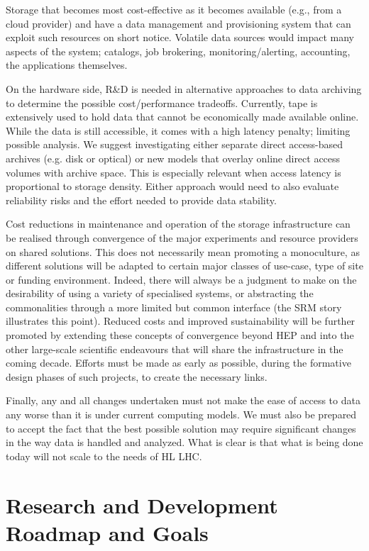 \documentclass[12pt,a4paper]{article}
\begin{document}
Storage that becomes most cost-effective as it becomes available (e.g.,
from a cloud provider) and have a data management and provisioning
system that can exploit such resources on short notice. Volatile data
sources would impact many aspects of the system; catalogs, job
brokering, monitoring/alerting, accounting, the applications themselves.

On the hardware side, R\&D is needed in alternative approaches to data
archiving to determine the possible cost/performance tradeoffs.
Currently, tape is extensively used to hold data that cannot be
economically made available online. While the data is still accessible,
it comes with a high latency penalty; limiting possible analysis. We
suggest investigating either separate direct access-based archives (e.g.
disk or optical) or new models that overlay online direct access volumes
with archive space. This is especially relevant when access latency is
proportional to storage density. Either approach would need to also
evaluate reliability risks and the effort needed to provide data
stability.

Cost reductions in maintenance and operation of the storage
infrastructure can be realised through convergence of the major
experiments and resource providers on shared solutions. This does not
necessarily mean promoting a monoculture, as different solutions will be
adapted to certain major classes of use-case, type of site or funding
environment. Indeed, there will always be a judgment to make on the
desirability of using a variety of specialised systems, or abstracting
the commonalities through a more limited but common interface (the SRM
story illustrates this point). Reduced costs and improved sustainability
will be further promoted by extending these concepts of convergence
beyond HEP and into the other large-scale scientific endeavours that
will share the infrastructure in the coming decade. Efforts must be made
as early as possible, during the formative design phases of such
projects, to create the necessary links.

Finally, any and all changes undertaken must not make the ease of access
to data any worse than it is under current computing models. We must
also be prepared to accept the fact that the best possible solution may
require significant changes in the way data is handled and analyzed.
What is clear is that what is being done today will not scale to the
needs of HL LHC.

\section{Research and Development Roadmap and
Goals}\label{research-and-development-roadmap-and-goals}
\end{document}
